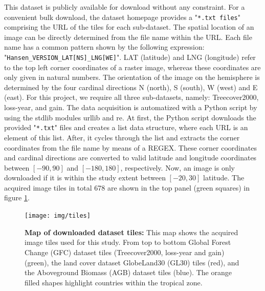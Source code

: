 		This dataset is publicly available for download without any constraint. For a convenient bulk download, the dataset homepage provides a "\verb|*.txt files|" comprising the \ac{URL} of the tiles for each sub-dataset. The spatial location of an image can be directly determined from the file name within the \ac{URL}. Each file name has a common pattern shown by the following expression: "\verb|Hansen_VERSION_LAT[NS]_LNG[WE]|". LAT (latitude) and LNG (longitude) refer to the top left corner coordinates of a raster image, whereas these coordinates are only given in natural numbers. The orientation of the image on the hemisphere is determined by the four cardinal directions N (north), S (south), W (west) and E (east). For this project, we require all three sub-datasets, namely: Treecover2000, loss-year, and gain. The data acquisition is automatized with a Python script by using the \ac{stdlib} modules urllib and re. At first, the Python script downloads the provided "\verb|*.txt|" files and creates a list data structure, where each \ac{URL} is an element of this list. After, it cycles through the list and extracts the corner coordinates from the file name by means of a \ac{REGEX}. These corner coordinates and cardinal directions are converted to valid latitude and longitude coordinates between $[-90, 90]$ and $[-180, 180]$, respectively. Now, an image is only downloaded if it is within the study extent between $[-20, 30]$ latitude. The acquired image tiles in total 678 are shown in the top panel (green squares) in figure \ref{fig:dataset_tiles}.
		\begin{figure}[ht]
			\centering
			\texttt{[image: img/tiles]}
			\caption[Map of dataset tiles]{\textbf{Map of downloaded dataset tiles:} This map shows the acquired image tiles used for this study. From top to bottom Global Forest Change (GFC) dataset tiles (Treecover2000, loss-year and gain) (green), the land cover dataset GlobeLand30 (GL30) tiles (red), and the Aboveground Biomass (AGB) dataset tiles (blue). The orange filled shapes highlight countries within the tropical zone.}
			\label{fig:dataset_tiles}
		\end{figure}

